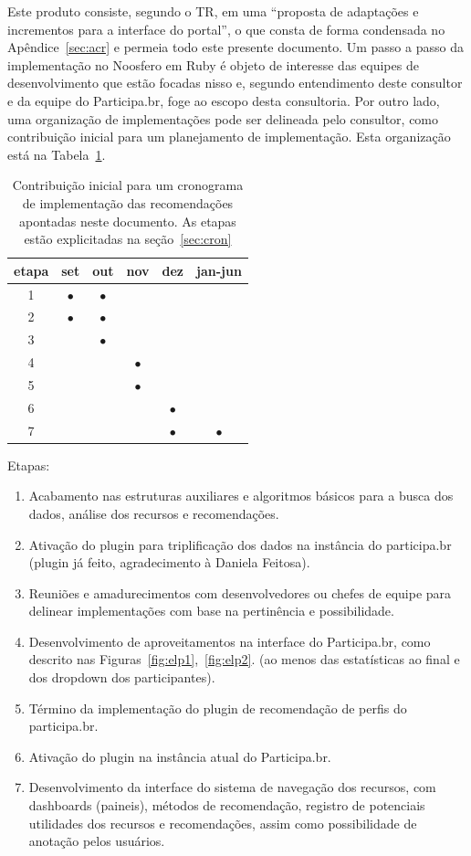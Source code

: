 \documentclass[12pt]{article}
\begin{document}
Este produto consiste, segundo o TR, em uma ``proposta de adaptações e incrementos para a interface do portal'', o que consta de forma condensada no Apêndice~\ref{sec:acr} e permeia todo este presente documento. Um passo a passo da implementação no Noosfero em Ruby é objeto de interesse das equipes de desenvolvimento que estão focadas nisso e, segundo entendimento deste consultor e da equipe do Participa.br, foge ao escopo desta consultoria. Por outro lado, uma organização de implementações pode ser delineada pelo consultor, como contribuição inicial para um planejamento de implementação. Esta organização está na Tabela~\ref{crono}.
\begin{table}[h]
\centering
\begin{tabular}{ | c || c | c | c | c | c |}\hline
etapa & set & out & nov & dez & jan-jun \\\hline\hline
1 & $\bullet$ & $\bullet$ & & & \\\hline
2 & $\bullet$ & $\bullet$ & & & \\\hline
3 & & $\bullet$ & & & \\\hline
4 & & & $\bullet$ & & \\\hline
5 & & & $\bullet$ & & \\\hline
6 & & & & $\bullet$ & \\\hline
7 & & & & $\bullet$ & $\bullet$ \\\hline
\end{tabular}
\caption{Contribuição inicial para um cronograma de implementação das recomendações apontadas neste documento. As etapas estão explicitadas na seção~\ref{sec:cron}}
\label{crono}
\end{table}

Etapas:
\begin{enumerate}
    \item Acabamento nas estruturas auxiliares e algoritmos básicos para a busca dos dados, análise dos recursos e recomendações.
    \item Ativação do plugin para triplificação dos dados na instância do participa.br (plugin já feito, agradecimento à Daniela Feitosa).
    \item Reuniões e amadurecimentos com desenvolvedores ou chefes de equipe para delinear implementações com base na pertinência e possibilidade.
    \item Desenvolvimento de aproveitamentos na interface do Participa.br, como descrito nas Figuras~\ref{fig:elp1},~\ref{fig:elp2}. (ao menos das estatísticas ao final e dos dropdown dos participantes).
    \item Término da implementação do plugin de recomendação de perfis do participa.br.
    \item Ativação do plugin na instância atual do Participa.br.
    \item Desenvolvimento da interface do sistema de navegação dos recursos, com dashboards (paineis), métodos de recomendação, registro de potenciais utilidades dos recursos e recomendações, assim como possibilidade de anotação pelos usuários.
\end{enumerate}
\end{document}
